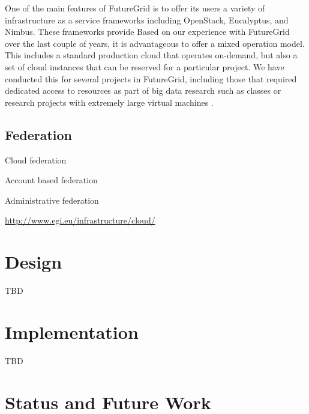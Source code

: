\documentclass{tex/sig-alternate-2013}
\begin{document}
One of the main features of FutureGrid is to offer its users a variety of infrastructure as a service frameworks \cite{comparisoncloud,las2011virt} including OpenStack, Eucalyptus, and Nimbus. These frameworks provide Based on our experience with FutureGrid over the last couple of years, it is advantageous to offer a mixed operation model. This includes a standard production cloud that operates on-demand, but also a set of cloud instances that can be reserved for a particular project. We have conducted this for several projects in FutureGrid, including those that required dedicated access to resources as part of big data research such as classes \cite{fg405,fg368} or research projects with extremely large virtual machines \cite{fg298}.

\subsection{Federation}

Cloud federation

Account based federation

Administrative federation

\url{http://www.egi.eu/infrastructure/cloud/}


\cite{kurze2011cloudfederation}




\section{Design}\label{S:design}

TBD

\section{Implementation}\label{S:implementation}

TBD

\section{Status and Future Work}
\end{document}
